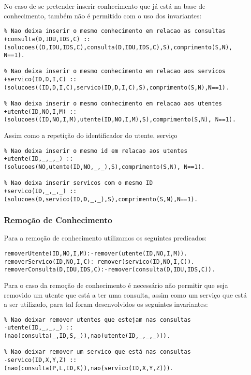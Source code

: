No caso de se pretender inserir conhecimento que já está na base de conhecimento, também não é permitido com o uso dos invariantes: 

\begin{Verbatim}
% Nao deixa inserir o mesmo conhecimento em relacao as consultas
+consulta(D,IDU,IDS,C) ::
(solucoes((D,IDU,IDS,C),consulta(D,IDU,IDS,C),S),comprimento(S,N),
N==1).

% Nao deixa inserir o mesmo conhecimento em relacao aos servicos
+servico(ID,D,I,C) :: 
(solucoes((ID,D,I,C),servico(ID,D,I,C),S),comprimento(S,N),N==1).

% Nao deixa inserir o mesmo conhecimento em relacao aos utentes
+utente(ID,NO,I,M) :: 
(solucoes((ID,NO,I,M),utente(ID,NO,I,M),S),comprimento(S,N), N==1).
\end{Verbatim}

Assim como a repetição do identificador do utente, serviço 

\begin{Verbatim}
% Nao deixa inserir o mesmo id em relacao aos utentes
+utente(ID,_,_,_) ::
(solucoes(NO,utente(ID,NO,_,_),S),comprimento(S,N), N==1).

% Nao deixa inserir servicos com o mesmo ID
+servico(ID,_,_,_) ::
(solucoes(D,servico(ID,D,_,_),S),comprimento(S,N),N==1).
\end{Verbatim}

\subsubsection{Remoção de Conhecimento}
Para a remoção de conhecimento utilizamos os seguintes predicados: 
\begin{verbatim}
removerUtente(ID,NO,I,M):-remover(utente(ID,NO,I,M)).
removerServico(ID,NO,I,C):-remover(servico(ID,NO,I,C)).
removerConsulta(D,IDU,IDS,C):-remover(consulta(D,IDU,IDS,C)).
\end{verbatim}

Para o caso da remoção de conhecimento é necessário não permitir que seja removido um utente que está a ter uma consulta, assim como um serviço que está a ser utilizado, para tal foram desenvolvidos os seguintes invariantes: 

\begin{verbatim}
% Nao deixar remover utentes que estejam nas consultas
-utente(ID,_,_,_) :: 
(nao(consulta(_,ID,S,_)),nao(utente(ID,_,_,_))).

% Nao deixar remover um servico que está nas consultas 
-servico(ID,X,Y,Z) :: 
(nao(consulta(P,L,ID,K)),nao(servico(ID,X,Y,Z))).
\end{verbatim}


